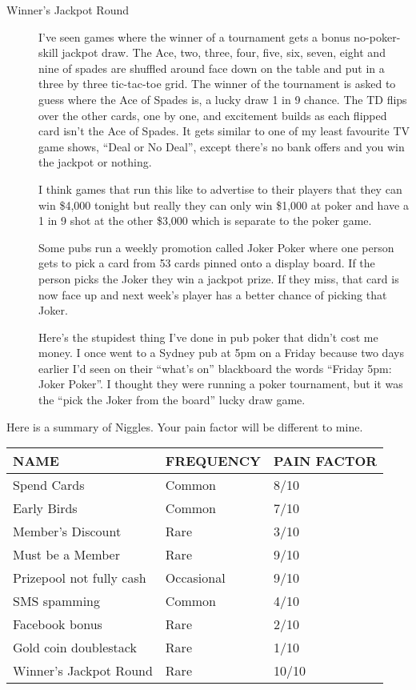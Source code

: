 \begin{description}
\item[Winner's Jackpot Round] I've seen games where the winner of a
tournament gets a bonus no-poker-skill jackpot draw. The Ace, two,
three, four, five, six, seven, eight and nine of spades are shuffled
around face down on the table and put in a three by three tic-tac-toe
grid. The winner of the tournament is asked to guess where the Ace of
Spades is, a lucky draw 1 in 9 chance. The TD flips over the other
cards, one by one, and excitement builds as each flipped card isn't
the Ace of Spades. It gets similar to one of my least favourite TV
game shows, ``Deal or No Deal'', except there's no bank offers and you
win the jackpot or nothing.

I think games that run this like to advertise to their players that
they can win \$4,000 tonight but really they can only win \$1,000 at
poker and have a 1 in 9 shot at the other \$3,000 which is separate to
the poker game.

Some pubs run a weekly promotion called Joker Poker where one person
gets to pick a card from 53 cards pinned onto a display board. If the
person picks the Joker they win a jackpot prize. If they miss, that
card is now face up and next week's player has a better chance of
picking that Joker.

Here's the stupidest thing I've done in pub poker that didn't cost me
money. I once went to a Sydney pub at 5pm on a Friday because two days
earlier I'd seen on their ``what's on'' blackboard the words ``Friday
5pm: Joker Poker''. I thought they were running a poker tournament,
but it was the ``pick the Joker from the board'' lucky draw game.

\end{description}

Here is a summary of Niggles. Your pain factor will be different to
mine.

\begin{tabular}{|l|l|l|} \hline
NAME    &  FREQUENCY  & PAIN FACTOR\\ \hline
Spend Cards & Common  & 8/10\\ \hline
Early Birds & Common & 7/10\\ \hline
Member's Discount & Rare  & 3/10\\ \hline
Must be a Member & Rare  & 9/10\\ \hline
Prizepool not fully cash & Occasional & 9/10\\ \hline
SMS spamming & Common & 4/10\\ \hline
Facebook bonus & Rare & 2/10 \\ \hline
Gold coin doublestack & Rare & 1/10 \\ \hline
Winner's Jackpot Round & Rare & 10/10 \\ \hline
\end{tabular}

